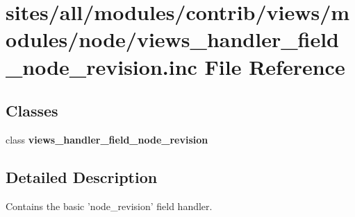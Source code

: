 \hypertarget{views__handler__field__node__revision_8inc}{
\section{sites/all/modules/contrib/views/modules/node/views\_\-handler\_\-field\_\-node\_\-revision.inc File Reference}
\label{views__handler__field__node__revision_8inc}
}
\subsection*{Classes}
\begin{CompactItemize}
\item 
class \textbf{views\_\-handler\_\-field\_\-node\_\-revision}
\end{CompactItemize}


\subsection{Detailed Description}
Contains the basic 'node\_\-revision' field handler. 